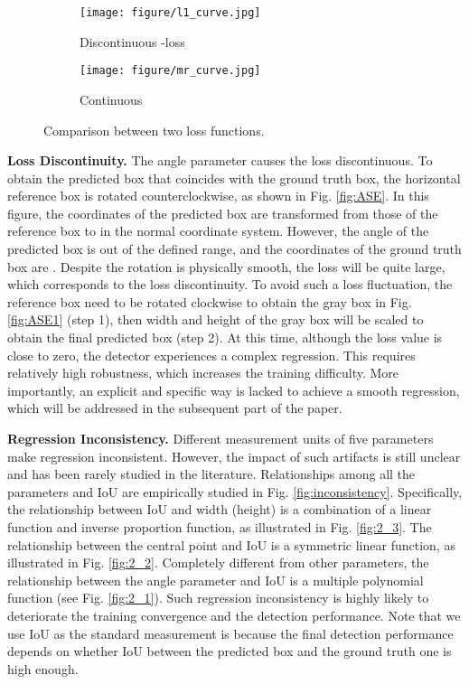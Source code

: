 \documentclass[10pt,twocolumn,letterpaper]{article}
\begin{document}
\begin{figure}[!tb]
    \centering
    \begin{subfigure}{.23\textwidth}
        \centering    \texttt{[image: figure/l1\_curve.jpg]}
        \caption{Discontinuous -loss}
        \label{fig:fig4a}
    \end{subfigure}
    \begin{subfigure}{.23\textwidth}
        \centering    \texttt{[image: figure/mr\_curve.jpg]}
        \caption{Continuous }
        \label{fig:fig4b}
    \end{subfigure}
    \vspace{-10pt}
    \caption{Comparison between two loss functions.}
    \label{fig:discontinuity}
    \vspace{-10pt}
\end{figure}

\textbf{Loss Discontinuity.}
The angle parameter causes the loss discontinuous. To obtain the predicted box that coincides with the ground truth box, the horizontal reference box is rotated counterclockwise, as shown in Fig. \ref{fig:ASE}. In this figure, the coordinates of the predicted box are transformed from those of the reference box  to  in the normal coordinate system. However, the angle of the predicted box is out of the defined range, and the coordinates of the ground truth box are . Despite the rotation is physically smooth, the loss will be quite large, which corresponds to the loss discontinuity. To avoid such a loss fluctuation, the reference box need to be rotated clockwise to obtain the gray box  in Fig. \ref{fig:ASE1} (step 1), then width and height of the gray box will be scaled to obtain the final predicted box  (step 2). At this time, although the loss value is close to zero, the detector experiences a complex regression. This requires relatively high robustness, which increases the training difficulty. More importantly, an explicit and specific way is lacked to achieve a smooth regression, which will be addressed in the subsequent part of the paper.

\textbf{Regression Inconsistency.}
Different measurement units of five parameters make regression inconsistent. However, the impact of such artifacts is still unclear and has been rarely studied in the literature. Relationships among all the parameters and IoU are empirically studied in Fig. \ref{fig:inconsistency}. Specifically, the relationship between IoU and width (height) is a combination of a linear function and inverse proportion function, as illustrated in Fig. \ref{fig:2_3}. The relationship between the central point and IoU is a symmetric linear function, as illustrated in Fig. \ref{fig:2_2}. Completely different from other parameters, the relationship between the angle parameter and IoU is a multiple polynomial function (see Fig. \ref{fig:2_1}). Such regression inconsistency is highly likely to deteriorate the training convergence and the detection performance. Note that we use IoU as the standard measurement is because the final detection performance depends on whether IoU between the predicted box and the ground truth one is high enough.
\end{document}

